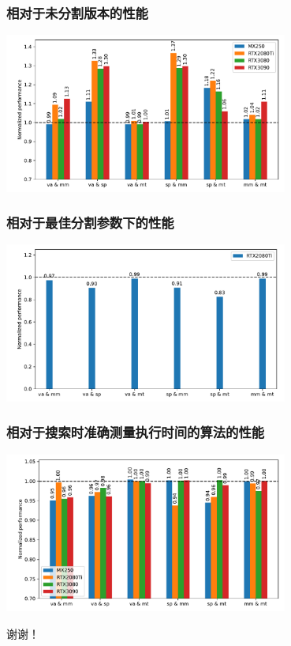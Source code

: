 \documentclass[aspectratio=169]{ctexbeamer}
\begin{document}
\begin{frame}
  \frametitle{相对于未分割版本的性能}

  \begin{center}
    \includegraphics[width=0.7\textwidth]{figures/perf-eval-diff-dev.pdf}
  \end{center}

\end{frame}

\begin{frame}
  \frametitle{相对于最佳分割参数下的性能}

  \begin{center}
    \includegraphics[width=0.7\textwidth]{figures/perf-eval-compared-to-opt.pdf}
  \end{center}

\end{frame}


\begin{frame}
  \frametitle{相对于搜索时准确测量执行时间的算法的性能}

  \begin{center}
    \includegraphics[width=0.7\textwidth]{figures/perf-eval-compared-to-nonsampling.pdf}
  \end{center}

\end{frame}

\begin{frame}
  \centerline{\Large 谢谢！}
\end{frame}
\end{document}
